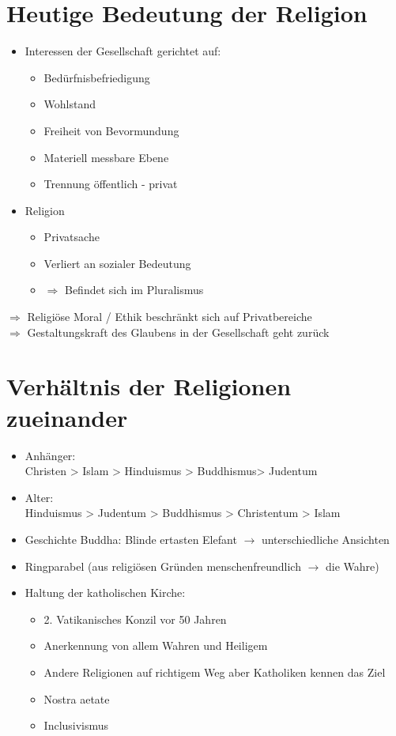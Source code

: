 \documentclass[11pt, paper=a4, twocolumn]{scrartcl}
\begin{document}
	\section{Heutige Bedeutung der Religion}

	\begin{itemize}
		\item Interessen der Gesellschaft gerichtet auf:
			\begin{itemize}
				\item Bedürfnisbefriedigung
				\item Wohlstand
				\item Freiheit von Bevormundung
				\item Materiell messbare Ebene
				\item Trennung öffentlich - privat
			\end{itemize}
		\item Religion
			\begin{itemize}
				\item Privatsache
				\item Verliert an sozialer Bedeutung
				\item $\Rightarrow$ Befindet sich im Pluralismus
			\end{itemize}
	\end{itemize}
	$\Rightarrow$ Religiöse Moral / Ethik beschränkt sich auf Privatbereiche\\
	$\Rightarrow$ Gestaltungskraft des Glaubens in der Gesellschaft geht zurück

	\section{Verhältnis der Religionen zueinander}

	\begin{itemize}
		\item Anhänger:\\
		Christen > Islam > Hinduismus > Buddhismus> Judentum
		\item Alter:\\
		Hinduismus > Judentum > Buddhismus > Christentum > Islam
		\item Geschichte Buddha: Blinde \glqq{}ertasten\grqq{} Elefant $\rightarrow$ unterschiedliche Ansichten
		\item Ringparabel (aus religiösen Gründen menschenfreundlich $\rightarrow$ die \glqq{}Wahre\grqq{})
		\item Haltung der katholischen Kirche:
			\begin{itemize}
				\item 2. Vatikanisches Konzil vor 50 Jahren
				\item Anerkennung von allem \glqq{}Wahren und Heiligem\grqq{}
				\item Andere Religionen auf richtigem Weg aber Katholiken kennen das \glqq{}Ziel\grqq{}
				\item Nostra aetate
				\item Inclusivismus
			\end{itemize}
	\end{itemize}
\end{document}
